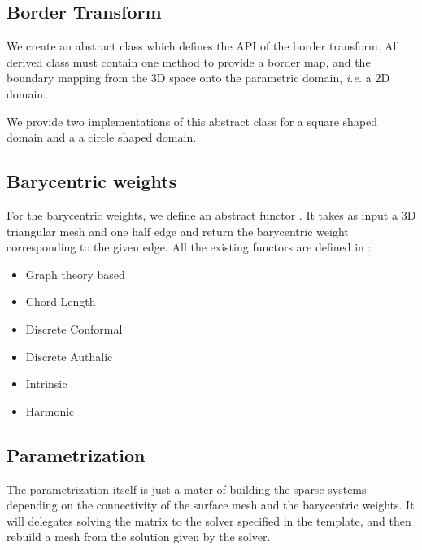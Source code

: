\documentclass{InsightArticle}
\def \ie {\textit{i.e. }}
\begin{document}
\subsection{Border Transform}

We create an abstract class  which defines the API of the border transform. All derived class must contain one method to provide a border map, and the boundary mapping from the 3D space onto the parametric domain, \ie a 2D domain.

We provide two implementations of this abstract class for a square shaped domain and a a circle shaped domain.

\subsection{Barycentric weights}

For the barycentric weights, we define an abstract functor . It takes as input a $3$D triangular mesh and one half edge and return the barycentric weight corresponding to the given edge.
All the existing functors are defined in :

\begin{itemize}
    \item Graph theory based 
    \item Chord Length 
    \item Discrete Conformal 
    \item Discrete Authalic 
    \item Intrinsic 
    \item Harmonic  
\end{itemize}

\subsection{Parametrization}

The parametrization itself is just a mater of building the sparse systems depending on the connectivity of the surface mesh and the barycentric weights. It will delegates solving the matrix to the solver specified in the template, and then rebuild a mesh from the solution given by the solver.
\end{document}
